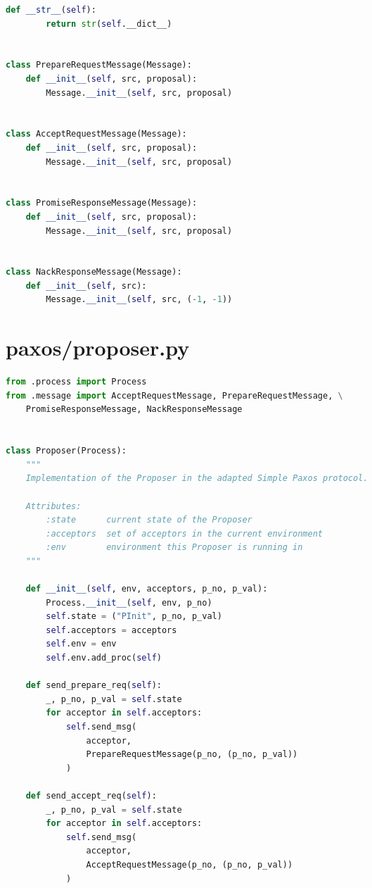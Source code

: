 \begin{landscape}
\begin{multicols*}{2}
\begin{lstlisting}[style=SourceCodeListing,language=Python]
    def __str__(self):
        return str(self.__dict__)


class PrepareRequestMessage(Message):
    def __init__(self, src, proposal):
        Message.__init__(self, src, proposal)


class AcceptRequestMessage(Message):
    def __init__(self, src, proposal):
        Message.__init__(self, src, proposal)


class PromiseResponseMessage(Message):
    def __init__(self, src, proposal):
        Message.__init__(self, src, proposal)


class NackResponseMessage(Message):
    def __init__(self, src):
        Message.__init__(self, src, (-1, -1))
\end{lstlisting}
\end{multicols*}

\newpage


\section{paxos/proposer.py}
\begin{multicols*}{2}
\begin{lstlisting}[style=SourceCodeListing,language=Python]
from .process import Process
from .message import AcceptRequestMessage, PrepareRequestMessage, \
    PromiseResponseMessage, NackResponseMessage


class Proposer(Process):
    """
    Implementation of the Proposer in the adapted Simple Paxos protocol.

    Attributes:
        :state      current state of the Proposer
        :acceptors  set of acceptors in the current environment
        :env        environment this Proposer is running in
    """

    def __init__(self, env, acceptors, p_no, p_val):
        Process.__init__(self, env, p_no)
        self.state = ("PInit", p_no, p_val)
        self.acceptors = acceptors
        self.env = env
        self.env.add_proc(self)

    def send_prepare_req(self):
        _, p_no, p_val = self.state
        for acceptor in self.acceptors:
            self.send_msg(
                acceptor,
                PrepareRequestMessage(p_no, (p_no, p_val))
            )

    def send_accept_req(self):
        _, p_no, p_val = self.state
        for acceptor in self.acceptors:
            self.send_msg(
                acceptor,
                AcceptRequestMessage(p_no, (p_no, p_val))
            )


\end{lstlisting}
\end{multicols*}
\end{landscape}
